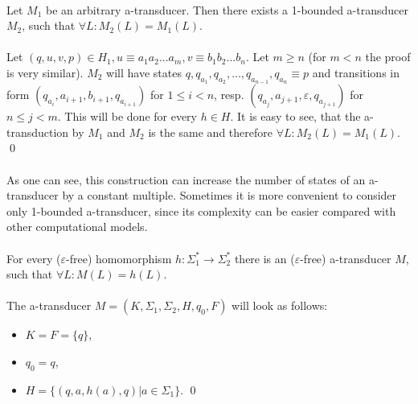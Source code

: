\paragraph{}
\clema Let $M_{1}$ be an arbitrary a-transducer. Then there exists a 1-bounded a-transducer $M_{2}$, such that $\forall L: M_{2}(L) = M_{1}(L)$.

\paragraph{}
\dokaz Let $(q, u, v, p) \in H_{1}, u \equiv a_{1}a_{2}...a_{m}, v \equiv b_{1}b_{2}...b_{n}$. Let $m\geq n$ (for $m < n$ the proof is very similar). $M_{2}$ will have states $q, q_{a_{1}}, q_{a_{2}}, ..., q_{a_{n-1}}, q_{a_{n}} \equiv p$ and transitions in form $(q_{a_{i}}, a_{i+1}, b_{i+1}, q_{a_{i+1}})$ for $1 \leq i<n$, resp. $(q_{a_{j}}, a_{j+1}, \varepsilon, q_{a_{j+1}})$ for $n \leq j < m$. This will be done for every $h \in H$. It is easy to see, that the a-transduction by $M_{1}$ and $M_{2}$ is the same and therefore $\forall L: M_{2}(L) = M_{1}(L)$. \qed

\paragraph{}
As one can see, this construction can increase the number of states of an a-transducer by a constant multiple. Sometimes it is more convenient to consider only 1-bounded a-transducer, since its complexity can be easier compared with other computational models.

\paragraph{}
\clema For every ($\varepsilon $-free) homomorphism $h: \Sigma_{1}^{*} \rightarrow \Sigma_{2}^{*}$ there is an ($\varepsilon $-free) a-transducer $M$, such that $\forall L: M(L) = h(L)$.

\paragraph{}
\dokaz The a-transducer $M=(K, \Sigma_{1}, \Sigma_{2}, H, q_{0}, F)$ will look as follows:
\begin{itemize}
\item $K = F = \{ q \}$,
\item $q_{0} = q$,
\item $H = \{ (q, a, h(a), q) | a \in \Sigma_{1} \}$. \qed
\end{itemize}

